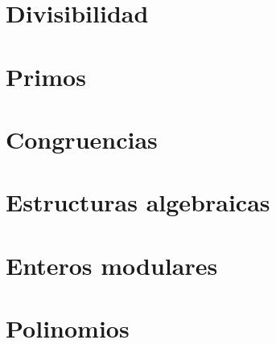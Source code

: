 \section{Divisibilidad}\label{sec:divisibilidad}


\section{Primos}\label{sec:primos}


\section{Congruencias}\label{sec:congruencias}


\section{Estructuras algebraicas}\label{sec:estructuras}


\section{Enteros modulares}\label{sec:modulares}


\section{Polinomios}\label{sec:polinomios}


